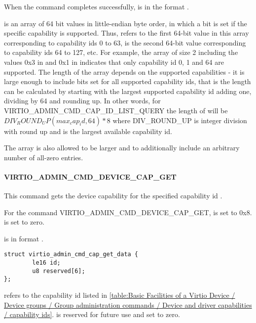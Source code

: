 When the command completes successfully, 
is in the format .

 is an array of 64 bit values in little-endian byte
order, in which a bit is set if the specific capability is supported.
Thus,  refers to the first 64-bit value in this
array corresponding to capability ids 0 to
63,  is the second 64-bit value corresponding to
capability ids 64 to 127, etc. For example, the array of size 2 including
the values 0x3 in  and 0x1 in
 indicates that only capability id 0, 1
and 64 are supported.
The length of the array depends on the supported capabilities - it is
large enough to include bits set for all supported capability ids,
that is the length can be calculated by starting with the largest
supported capability id adding one, dividing by 64 and rounding up.
In other words, for VIRTIO_ADMIN_CMD_CAP_ID_LIST_QUERY the length of
 will be
$DIV_ROUND_UP(max_cap_id, 64) * 8$ where DIV_ROUND_UP is integer division
with round up and  is the largest available capability id.

The array is also allowed to be larger and to additionally include an arbitrary
number of all-zero entries.

\paragraph{VIRTIO_ADMIN_CMD_DEVICE_CAP_GET}\label{par:Basic Facilities of a Virtio Device / Device groups / Group administration commands / Device and driver capabilities / VIRTIO_ADMIN_CMD_DEVICE_CAP_GET}

This command gets the device capability for the specified capability
id .

For the command VIRTIO_ADMIN_CMD_DEVICE_CAP_GET,  is set to 0x8.
 is set to zero.

 is in format
.

\begin{lstlisting}
struct virtio_admin_cmd_cap_get_data {
        le16 id;
        u8 reserved[6];
};
\end{lstlisting}

 refers to the capability id listed in \ref{table:Basic Facilities of a Virtio Device / Device groups / Group administration commands / Device and driver capabilities / capability ids}.
 is reserved for future use and set to zero.

